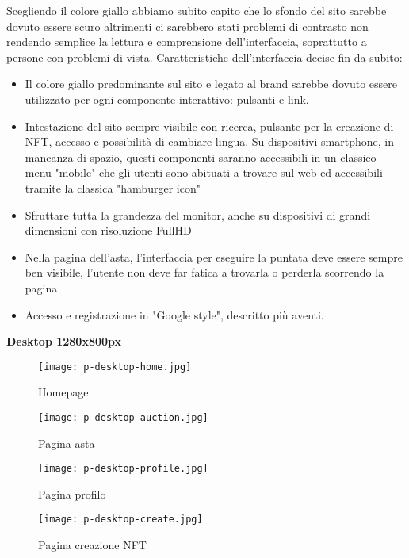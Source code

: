 Scegliendo il colore giallo abbiamo subito capito che lo sfondo del sito sarebbe dovuto essere scuro 
altrimenti ci sarebbero stati problemi di contrasto non rendendo semplice la lettura e comprensione dell'interfaccia, 
soprattutto a persone con problemi di vista.
\bigbreak
\noindent
Caratteristiche dell'interfaccia decise fin da subito:
\begin{itemize}
	\item Il colore giallo predominante sul sito e legato al brand sarebbe dovuto essere utilizzato per ogni componente interattivo: pulsanti e link.
	\item Intestazione del sito sempre visibile con ricerca, pulsante per la creazione di NFT, accesso  e possibilità di cambiare lingua.
	Su dispositivi smartphone, in mancanza di spazio, questi componenti saranno accessibili in un classico menu "mobile" 
	che gli utenti sono abituati a trovare sul web ed accessibili tramite la classica "hamburger icon"
	\item Sfruttare tutta la grandezza del monitor, anche su dispositivi di grandi dimensioni con risoluzione FullHD
	\item Nella pagina dell'asta, l'interfaccia per eseguire la puntata deve essere sempre ben visibile, 
	l'utente non deve far fatica a trovarla o perderla scorrendo la pagina
	\item Accesso e registrazione in "Google style", descritto più aventi.
\end{itemize}

\clearpage

\bigbreak
\noindent
\textbf{Desktop 1280x800px}

\begin{figure}[H]
	\centering
	\texttt{[image: p-desktop-home.jpg]}
	\caption{Homepage}
	\label{fig:pDesktopHome}
\end{figure}
\begin{figure}[H]
	\centering
	\texttt{[image: p-desktop-auction.jpg]}
	\caption{Pagina asta}
	\label{fig:pDesktopAuction}
\end{figure}
\begin{figure}[H]
	\centering
	\texttt{[image: p-desktop-profile.jpg]}
	\caption{Pagina profilo}
	\label{fig:pDesktopProfile}
\end{figure}
\begin{figure}[H]
	\centering
	\texttt{[image: p-desktop-create.jpg]}
	\caption{Pagina creazione NFT}
	\label{fig:pDesktopCreate}
\end{figure}

